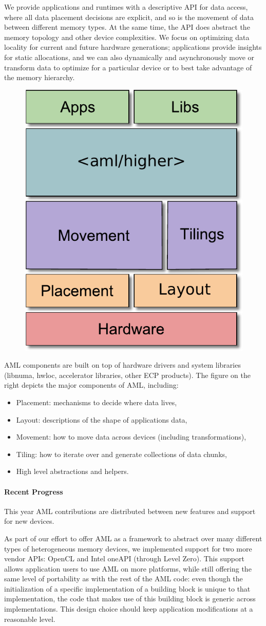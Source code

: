 We provide applications and runtimes with a descriptive API for data
access, where all data placement decisions are explicit, and so is the
movement of data between different memory types.  At the same time, the API
does abstract the memory topology and other device complexities.  We focus
on optimizing data locality for current and future hardware generations;
applications provide insights for static allocations, and we can also
dynamically and asynchronously move or transform data to optimize for a particular 
device or to best take advantage of the memory hierarchy.

\begin{figure}
\includegraphics[width=.18\textwidth]{projects/2.3.1-PMR/2.3.1.19-Argo-PowerSteering/aml-components}
\end{figure}
AML components are built on top of hardware drivers and system
libraries (libnuma, hwloc, accelerator libraries, other ECP products).
The figure on the right depicts the major components of AML, including:
\begin{itemize}
\item Placement: mechanisms to decide where data lives,
\item Layout: descriptions of the shape of applications data,
\item Movement: how to move data across devices (including transformations),
\item Tiling: how to iterate over and generate collections of data chunks,
\item High level abstractions and helpers.
\end{itemize}

\paragraph{Recent Progress}

This year AML contributions are distributed between new features and
support for new devices.

As part of our effort to offer AML as a framework to abstract over many
different types of heterogeneous memory devices, we implemented support for
two more vendor APIs: OpenCL and Intel oneAPI (through Level Zero). This
support allows application users to use AML on more platforms, while still
offering the same level of portability as with the rest of the AML code:
even though the initialization of a specific implementation of a building
block is unique to that implementation, the code that makes use of this
building block is generic across implementations. This design choice should
keep application modifications at a reasonable level.


